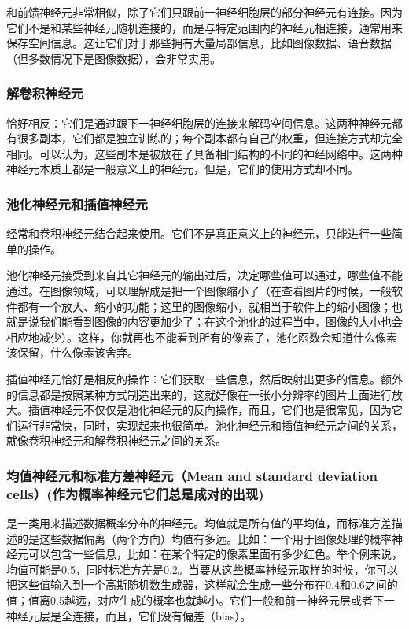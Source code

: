 和前馈神经元非常相似，除了它们只跟前一神经细胞层的部分神经元有连接。因为它们不是和某些神经元随机连接的，而是与特定范围内的神经元相连接，通常用来保存空间信息。这让它们对于那些拥有大量局部信息，比如图像数据、语音数据（但多数情况下是图像数据），会非常实用。

\subsubsection{解卷积神经元}

恰好相反：它们是通过跟下一神经细胞层的连接来解码空间信息。这两种神经元都有很多副本，它们都是独立训练的；每个副本都有自己的权重，但连接方式却完全相同。可以认为，这些副本是被放在了具备相同结构的不同的神经网络中。这两种神经元本质上都是一般意义上的神经元，但是，它们的使用方式却不同。

\subsubsection{池化神经元和插值神经元}

经常和卷积神经元结合起来使用。它们不是真正意义上的神经元，只能进行一些简单的操作。

池化神经元接受到来自其它神经元的输出过后，决定哪些值可以通过，哪些值不能通过。在图像领域，可以理解成是把一个图像缩小了（在查看图片的时候，一般软件都有一个放大、缩小的功能；这里的图像缩小，就相当于软件上的缩小图像；也就是说我们能看到图像的内容更加少了；在这个池化的过程当中，图像的大小也会相应地减少）。这样，你就再也不能看到所有的像素了，池化函数会知道什么像素该保留，什么像素该舍弃。

插值神经元恰好是相反的操作：它们获取一些信息，然后映射出更多的信息。额外的信息都是按照某种方式制造出来的，这就好像在一张小分辨率的图片上面进行放大。插值神经元不仅仅是池化神经元的反向操作，而且，它们也是很常见，因为它们运行非常快，同时，实现起来也很简单。池化神经元和插值神经元之间的关系，就像卷积神经元和解卷积神经元之间的关系。

\subsubsection{均值神经元和标准方差神经元（Mean and standard deviation cells）(作为概率神经元它们总是成对的出现)}
是一类用来描述数据概率分布的神经元。均值就是所有值的平均值，而标准方差描述的是这些数据偏离（两个方向）均值有多远。比如：一个用于图像处理的概率神经元可以包含一些信息，比如：在某个特定的像素里面有多少红色。举个例来说，均值可能是0.5，同时标准方差是0.2。当要从这些概率神经元取样的时候，你可以把这些值输入到一个高斯随机数生成器，这样就会生成一些分布在0.4和0.6之间的值；值离0.5越远，对应生成的概率也就越小。它们一般和前一神经元层或者下一神经元层是全连接，而且，它们没有偏差（bias）。

